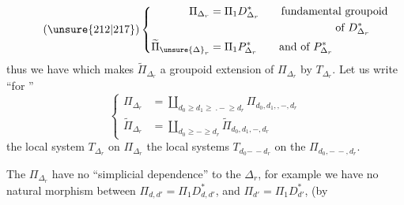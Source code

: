 \[
\tag{\unsure{212|217}}
\left\{\begin{aligned}
\Pi_{\Delta_r}&=\Pi_1D^*_{\Delta_r}\qquad\text{fundamental groupoid}\\
&\hspace{4cm}\text{of }D^*_{\Delta_r}\\
\widetilde\Pi_{\unsure{\Delta}_r}&=\Pi_1P^*_{\Delta_r}\qquad\text{and of }P^*_{\Delta_r}
\end{aligned}\right.
\]
thus we have
which makes $\widetilde\Pi_{\Delta_r}$ a groupoid
extension of $\Pi_{\Delta_r}$ by $T_{\Delta_r}$.
Let us write ``for ''
\[
\tag{214}
\left\{\begin{aligned}
\Pi_{\Delta_r}&=\coprod_{d_0\geq d_1\geq\mathord{\text{.}\,-}\geq d_r}\Pi_{d_0,d_1,,-,d_r}\\
\widetilde\Pi_{\Delta_r}&=\coprod_{d_0\geq-\geq d_r}\widetilde\Pi_{d_0,d_1,-,d_r}
\end{aligned}\right.
\]
the local system $T_{\Delta_r}$ on $\Pi_{\Delta_r}$ 
 the local systems
$T_{d_0\mathord{-\, -}d_r}$ on the $\Pi_{d_0,\mathord{-\, -},d_r}$.

The $\Pi_{\Delta_r}$ have no ``simplicial
dependence''  to the $\Delta_r$, for example we have
no natural morphism between
$\Pi_{d,d'}=\Pi_1D^*_{d,d'}$, and $\Pi_{d'}=\Pi_1D^*_{d'}$, (by
